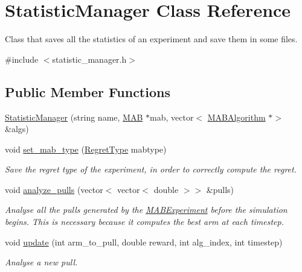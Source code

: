 \hypertarget{class_statistic_manager}{}\section{Statistic\+Manager Class Reference}
\label{class_statistic_manager}


Class that saves all the statistics of an experiment and save them in some files.  




{\ttfamily \#include $<$statistic\+\_\+manager.\+h$>$}

\subsection*{Public Member Functions}
\begin{DoxyCompactItemize}
\item 
\mbox{\hyperlink{class_statistic_manager_a7791d6be8cb2cc1b61f7329e94c541dc}{Statistic\+Manager}} (string name, \mbox{\hyperlink{class_m_a_b}{M\+AB}} $\ast$mab, vector$<$ \mbox{\hyperlink{class_m_a_b_algorithm}{M\+A\+B\+Algorithm}} $\ast$$>$ \&algs)
\item 
void \mbox{\hyperlink{class_statistic_manager_a8b5cc66719690cbb8dcc55e736cd90b7}{set\+\_\+mab\+\_\+type}} (\mbox{\hyperlink{mab_8h_ab8d3b06b9f83219c5bb8daa68136f908}{Regret\+Type}} mabtype)
\begin{DoxyCompactList}\small\item\em Save the regret type of the experiment, in order to correctly compute the regret. \end{DoxyCompactList}\item 
void \mbox{\hyperlink{class_statistic_manager_a234e372f4039a24bdccdca7e5b199914}{analyze\+\_\+pulls}} (vector$<$ vector$<$ double $>$$>$ \&pulls)
\begin{DoxyCompactList}\small\item\em Analyse all the pulls generated by the \mbox{\hyperlink{class_m_a_b_experiment}{M\+A\+B\+Experiment}} before the simulation begins. This is necessary because it computes the best arm at each timestep. \end{DoxyCompactList}\item 
void \mbox{\hyperlink{class_statistic_manager_a964a37aed52de5b4ec19369a452b79b1}{update}} (int arm\+\_\+to\+\_\+pull, double reward, int alg\+\_\+index, int timestep)
\begin{DoxyCompactList}\small\item\em Analyse a new pull. \end{DoxyCompactList}\item 

\end{DoxyCompactItemize}
